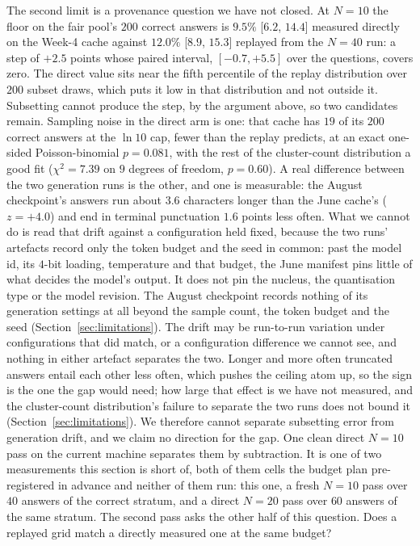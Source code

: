 The second limit is a provenance question we have not closed. At $N{=}10$ the floor on the
fair pool's $200$ correct answers is $9.5\%$ [$6.2$, $14.4$] measured directly on the Week-4
cache against $12.0\%$ [$8.9$, $15.3$] replayed from the $N{=}40$ run: a step of $+2.5$ points
whose paired interval, $[-0.7, +5.5]$ over the questions,
covers zero. The direct value sits near the fifth percentile of the replay
distribution over $200$ subset draws, which puts it low in that distribution and not outside
it. Subsetting cannot produce
the step, by the argument above, so two candidates remain. Sampling noise in the direct arm is
one: that cache has $19$ of its $200$ correct answers at the $\ln 10$ cap, fewer than the
replay predicts, at an exact one-sided Poisson-binomial $p{=}0.081$, with the rest of the
cluster-count distribution a good fit ($\chi^{2}{=}7.39$ on $9$ degrees of freedom,
$p{=}0.60$). A real difference between the two generation runs is the other, and
one is measurable: the August checkpoint's answers run about $3.6$
characters longer than the June cache's ($z{=}+4.0$) and end in terminal punctuation $1.6$
points less often. What we cannot do is read that drift against a configuration held fixed,
because the two runs' artefacts record only the token budget and the seed in common: past
the model id, its $4$-bit loading, temperature and that budget, the June manifest pins little
of what decides the model's
output. It does not pin the nucleus, the quantisation type or the model revision. The
August checkpoint records nothing of its generation settings at all beyond the sample
count, the token budget and the seed (Section~\ref{sec:limitations}). The drift may be run-to-run variation under configurations
that did match, or a configuration difference we cannot see, and nothing in either artefact
separates the two. Longer and more often truncated answers entail each other less often,
which pushes the ceiling atom up, so the sign is the one the gap would need; how large that
effect is we have not measured, and the cluster-count distribution's failure to separate the
two runs does not bound it (Section~\ref{sec:limitations}). We therefore cannot
separate subsetting error from generation drift, and we claim no direction for the gap. One
clean direct $N{=}10$ pass on the current machine separates them by subtraction. It is one of
two measurements this section is short of, both of them cells the budget plan pre-registered
in advance and neither of them run: this one, a fresh $N{=}10$ pass over $40$ answers of
the correct stratum, and a direct $N{=}20$ pass over $60$ answers of the same stratum. The
second pass asks the other half of this question. Does a replayed grid match a directly
measured one at the same budget?

